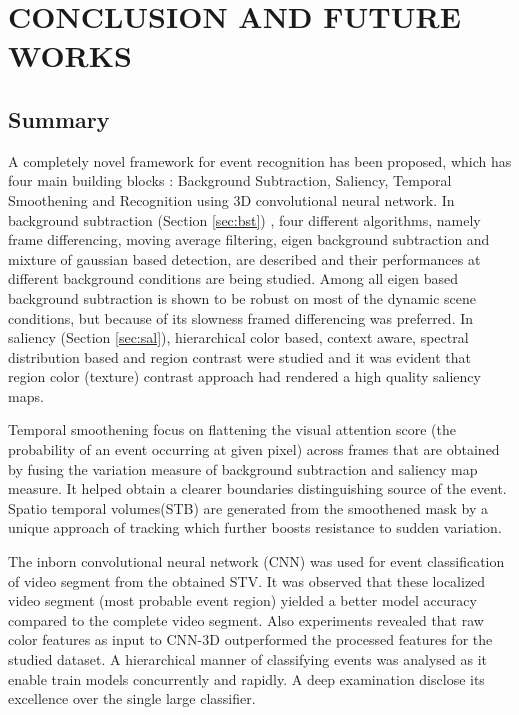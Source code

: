 \chapter{CONCLUSION AND FUTURE WORKS}
\label{chap:concl}

\section{Summary}
A completely novel framework for event recognition has been proposed, which has four main building blocks : Background Subtraction, Saliency, Temporal Smoothening and Recognition using 3D convolutional neural network. In background subtraction (Section \ref{sec:bst}) , four different algorithms, namely frame differencing, moving average filtering, eigen background subtraction and mixture of gaussian based detection, are described and their performances at different background conditions are being studied.  Among all eigen based background subtraction is shown to be robust on most of the dynamic scene conditions, but because of its slowness  framed differencing was preferred. In saliency (Section \ref{sec:sal}), hierarchical color based, context aware, spectral distribution based and region contrast were studied and it was evident that region color (texture) contrast approach had rendered a high quality saliency maps.

\par Temporal smoothening focus on flattening the visual attention score (the probability of an event occurring at given pixel) across frames that are obtained by fusing the variation measure of background subtraction and saliency map measure. It helped obtain a clearer boundaries distinguishing source of the event. Spatio temporal volumes(STB) are generated from the smoothened mask by a unique approach of tracking which further boosts resistance to sudden variation.

\par The inborn convolutional neural network (CNN) was used for event classification of video segment from the  obtained STV. It was observed that these localized video segment (most probable event region) yielded a better model accuracy compared to the complete video segment. Also experiments revealed that raw color features as input to CNN-3D outperformed the processed features for the studied dataset. A hierarchical manner of classifying events was analysed as it enable train models concurrently and rapidly. A deep examination disclose its excellence over the single large classifier. 

